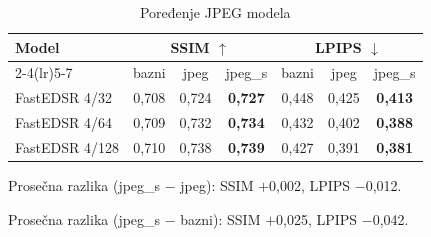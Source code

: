 \begin{table}[H]
    \begin{tabular}{lcccccc}
        \toprule
        Model & \multicolumn{3}{c}{SSIM $\uparrow$} & \multicolumn{3}{c}{LPIPS $\downarrow$} \\
        \cmidrule(lr){2-4}\cmidrule(lr){5-7}
         & bazni & jpeg & jpeg\_s & bazni & jpeg & jpeg\_s \\
        \midrule
        FastEDSR 4/32 & 0,708 & 0,724 & \textbf{0,727} & 0,448 & 0,425 & \textbf{0,413} \\
        FastEDSR 4/64 & 0,709 & 0,732 & \textbf{0,734} & 0,432 & 0,402 & \textbf{0,388} \\
        FastEDSR 4/128 & 0,710 & 0,738 & \textbf{0,739} & 0,427 & 0,391 & \textbf{0,381} \\
        \bottomrule
    \end{tabular}
    \caption{Poređenje JPEG modela}
    \label{tab:jpeg_4x_DIV2K_jpeg80_vs_s}
\end{table}

\noindent Prosečna razlika (jpeg\_s $-$ jpeg): SSIM $+$0,002, LPIPS $-$0,012.

\noindent Prosečna razlika (jpeg\_s $-$ bazni): SSIM $+$0,025, LPIPS $-$0,042.